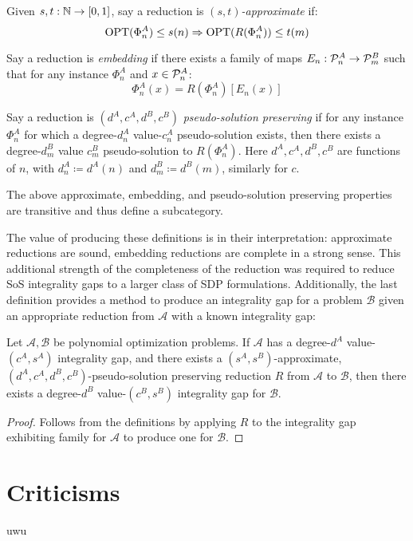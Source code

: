 \documentclass[runningheads,a4paper,english]{llncs}[2022/01/12]
\begin{document}
\begin{definition}
  Given $s, t : \mathbb{N} \to [0,1]$, say a reduction is $(s, t)$\emph{-approximate} if:
  \[\operatorname{OPT}(\Phi_n^A) \le s(n) \Rightarrow \operatorname{OPT}(R(\Phi_n^A)) \le t(m)\]
\end{definition}
\begin{definition}
  Say a reduction is \emph{embedding} if there exists a family of maps $E_n : \mathcal{P}_n^A \to \mathcal{P}_m^B$ such that for any instance $\Phi_n^A$ and $x \in \mathcal{P}_n^A$:
  \[\Phi_n^A(x) = R(\Phi_n^A)[E_n(x)]\]
\end{definition}
\begin{definition}
  Say a reduction is $(d^A, c^A, d^B, c^B)$ \emph{pseudo-solution preserving} if for any instance $\Phi_n^A$ for which a degree-$d_n^A$ value-$c_n^A$ pseudo-solution exists, then there exists a degree-$d_m^B$ value $c_m^B$ pseudo-solution to $R(\Phi_n^A)$. Here $d^A, c^A, d^B, c^B$ are functions of $n$, with $d_n^A \coloneq d^A(n)$ and $d_m^B \coloneq d^B(m)$, similarly for $c$.
\end{definition}
\begin{proposition}
  The above approximate, embedding, and pseudo-solution preserving properties are transitive and thus define a subcategory.
\end{proposition}
The value of producing these definitions is in their interpretation: approximate reductions are sound, embedding reductions are complete in a strong sense.
This additional strength of the completeness of the reduction was required to reduce SoS integrality gaps to a larger class of SDP formulations.
Additionally, the last definition provides a method to produce an integrality gap for a problem $\mathscr{B}$ given an appropriate reduction from $\mathscr{A}$ with a known integrality gap:
\begin{proposition}
  Let $\mathscr{A}, \mathscr{B}$ be polynomial optimization problems. If $\mathscr{A}$ has a degree-$d^A$ value-$(c^A, s^A)$ integrality gap, and there exists a $(s^A, s^B)$-approximate, $(d^A, c^A, d^B, c^B)$-pseudo-solution preserving reduction $R$ from $\mathscr{A}$ to $\mathscr{B}$, then there exists a degree-$d^B$ value-$(c^B, s^B)$ integrality gap for $\mathscr{B}$.
\end{proposition}
\begin{proof}
  Follows from the definitions by applying $R$ to the integrality gap exhibiting family for $\mathscr{A}$ to produce one for $\mathscr{B}$.
\end{proof}

\section{Criticisms}
\label{sec:criticisms}
uwu
\end{document}
